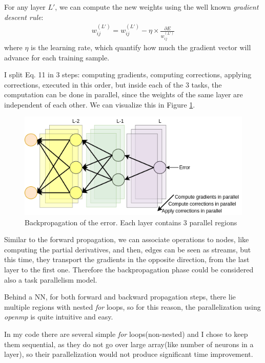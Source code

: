 \documentclass{article}
\begin{document}
	
	For any layer $L'$, we can compute the new weights using the well known \textit{gradient descent rule}:
	\begin{eqnarray}
		w^{(L')}_{ij} = 	w^{(L')}_{ij} - \eta \times \frac{\partial E}{w^{(L')}_{ij}}
	\end{eqnarray}
	where $\eta$ is the learning rate, which quantify how much the gradient vector will advance for each training sample.
	
	I split Eq. 11 in 3 steps: computing gradients, computing corrections, applying corrections, executed in this order, but inside each of the 3 tasks, the computation can be done in parallel, since the weights of the same layer are independent of each other. We can visualize this in Figure \ref{fig:back}.
	
	\begin{figure}[htbp]
		\centering
		\includegraphics[scale=0.6]{fig/back_2.png}
		\caption{Backpropagation of the error. Each layer contains 3 parallel regions}
		\label{fig:back}
	\end{figure}
	
	\newpage
	
	Similar to the forward propagation, we can associate operations to nodes, like computing the partial derivatives, and then, edges can be seen as streams, but this time, they transport the gradients in the opposite direction, from the last layer to the first one. Therefore the backpropagation phase could be considered also a task parallelism model.
	
	Behind a NN, for both forward and backward propagation steps, there lie multiple regions with nested \textit{for} loops, so for this reason, the parallelization using \textit{openmp} is quite intuitive and easy.
	
	In my code there are several simple \textit{for} loops(non-nested) and I chose to keep them sequential, as they do not go over large array(like number of neurons in a layer), so their parallelization would not produce significant time improvement.
	
\end{document}
